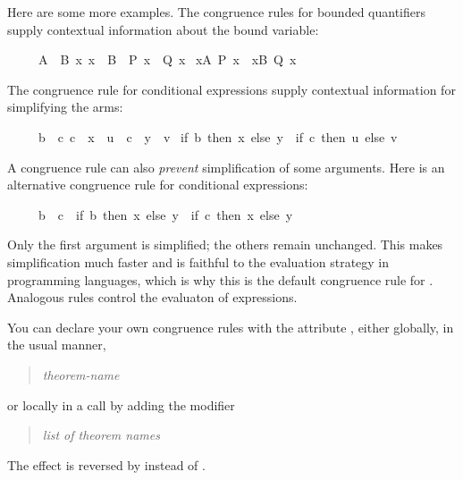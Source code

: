 \begin{isabellebody}
\begin{isamarkuptext}
Here are some more examples.  The congruence rules for bounded
quantifiers supply contextual information about the bound variable:
\begin{isabelle}%
\ \ \ \ \ {\isasymlbrakk}A\ {\isacharequal}\ B{\isacharsemicolon}\ {\isasymAnd}x{\isachardot}\ x\ {\isasymin}\ B\ {\isasymLongrightarrow}\ P\ x\ {\isacharequal}\ Q\ x{\isasymrbrakk}\isanewline
\isaindent{\ \ \ \ \ }{\isasymLongrightarrow}\ {\isacharparenleft}{\isasymforall}x{\isasymin}A{\isachardot}\ P\ x{\isacharparenright}\ {\isacharequal}\ {\isacharparenleft}{\isasymforall}x{\isasymin}B{\isachardot}\ Q\ x{\isacharparenright}%
\end{isabelle}
The congruence rule for conditional expressions supply contextual
information for simplifying the arms:
\begin{isabelle}%
\ \ \ \ \ {\isasymlbrakk}b\ {\isacharequal}\ c{\isacharsemicolon}\ c\ {\isasymLongrightarrow}\ x\ {\isacharequal}\ u{\isacharsemicolon}\ {\isasymnot}\ c\ {\isasymLongrightarrow}\ y\ {\isacharequal}\ v{\isasymrbrakk}\isanewline
\isaindent{\ \ \ \ \ }{\isasymLongrightarrow}\ {\isacharparenleft}if\ b\ then\ x\ else\ y{\isacharparenright}\ {\isacharequal}\ {\isacharparenleft}if\ c\ then\ u\ else\ v{\isacharparenright}%
\end{isabelle}
A congruence rule can also \emph{prevent} simplification of some arguments.
Here is an alternative congruence rule for conditional expressions:
\begin{isabelle}%
\ \ \ \ \ b\ {\isacharequal}\ c\ {\isasymLongrightarrow}\ {\isacharparenleft}if\ b\ then\ x\ else\ y{\isacharparenright}\ {\isacharequal}\ {\isacharparenleft}if\ c\ then\ x\ else\ y{\isacharparenright}%
\end{isabelle}
Only the first argument is simplified; the others remain unchanged.
This makes simplification much faster and is faithful to the evaluation
strategy in programming languages, which is why this is the default
congruence rule for . Analogous rules control the evaluaton of
 expressions.

You can declare your own congruence rules with the attribute ,
either globally, in the usual manner,
\begin{quote}
 \textit{theorem-name} 
\end{quote}
or locally in a  call by adding the modifier
\begin{quote}
 \textit{list of theorem names}
\end{quote}
The effect is reversed by  instead of .


\end{isamarkuptext}
\end{isabellebody}
